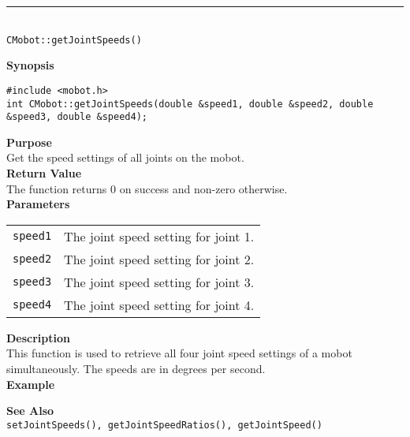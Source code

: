 \noindent
\vspace{5pt}
\rule{4.5in}{0.015in}\\
\noindent
{\LARGE \texttt{CMobot::getJointSpeeds()}}\\
{}

\noindent
{\bf Synopsis}
\vspace{-8pt}
\begin{verbatim}
#include <mobot.h>
int CMobot::getJointSpeeds(double &speed1, double &speed2, double &speed3, double &speed4);
\end{verbatim}

\noindent
{\bf Purpose}\\
Get the speed settings of all joints on the mobot.\\

\noindent
{\bf Return Value}\\
The function returns 0 on success and non-zero otherwise.\\

\noindent
{\bf Parameters}
\vspace{-0.1in}
\begin{description}
\item               
\begin{tabular}{p{10 mm}p{145 mm}}
\texttt{speed1} & The joint speed setting for joint 1.\\
\texttt{speed2} & The joint speed setting for joint 2.\\
\texttt{speed3} & The joint speed setting for joint 3.\\
\texttt{speed4} & The joint speed setting for joint 4.\\
\end{tabular}
\end{description}

\noindent
{\bf Description}\\
This function is used to retrieve all four joint speed settings of a mobot
simultaneously. The speeds are in degrees per second. \\

\noindent
{\bf Example}\\
\noindent

\noindent
{\bf See Also}\\
\texttt{setJointSpeeds(), getJointSpeedRatios(), getJointSpeed()}

